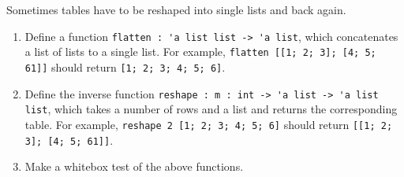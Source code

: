 Sometimes tables have to be reshaped into single lists and back again.
\begin{enumerate}
\item Define a function \lstinline{flatten : 'a list list -> 'a list}, which concatenates a list of lists to a single list.  For example, \lstinline{flatten [[1; 2; 3]; [4; 5; 61]]} should return \lstinline{[1; 2; 3; 4; 5; 6]}.
\item Define the inverse function \lstinline{reshape : m : int -> 'a list -> 'a list list}, which takes a number of rows and a list and returns the corresponding table. For example, \lstinline{reshape 2 [1; 2; 3; 4; 5; 6]} should return \lstinline{[[1; 2; 3]; [4; 5; 61]]}.
\item Make a whitebox test of the above functions.
\end{enumerate}